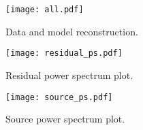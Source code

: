 \documentclass[12pt]{article}
\begin{document}



\clearpage
\pagebreak




\begin{figure}[!htb]
	\centering
	\texttt{[image: all.pdf]}
	\caption{Data and model reconstruction. \label{fig:all}}
\end{figure}



\clearpage
\pagebreak


\begin{figure}
  \centering
  \texttt{[image: residual\_ps.pdf]}
  \caption{Residual power spectrum plot. \label{fig:residual_ps}}
\end{figure}
\begin{figure}
  \centering
  \texttt{[image: source\_ps.pdf]}
  \caption{Source power spectrum plot. \label{fig:source_ps}}
\end{figure}

\clearpage
\pagebreak

\end{document}
